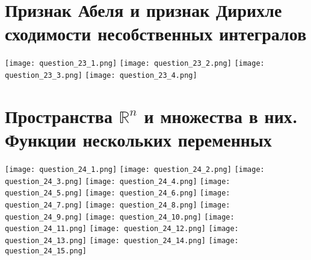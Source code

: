 \documentclass[a4paper,12pt]{article}
\begin{document}
\section{Признак Абеля и признак Дирихле сходимости несобственных интегралов}
\texttt{[image: question\_23\_1.png]}
\texttt{[image: question\_23\_2.png]}
\texttt{[image: question\_23\_3.png]}
\texttt{[image: question\_23\_4.png]}

\section{Пространства \( \mathbb{R}^n \) и множества в них. Функции нескольких переменных}
\texttt{[image: question\_24\_1.png]}
\texttt{[image: question\_24\_2.png]}
\texttt{[image: question\_24\_3.png]}
\texttt{[image: question\_24\_4.png]}
\texttt{[image: question\_24\_5.png]}
\texttt{[image: question\_24\_6.png]}
\texttt{[image: question\_24\_7.png]}
\texttt{[image: question\_24\_8.png]}
\texttt{[image: question\_24\_9.png]}
\texttt{[image: question\_24\_10.png]}
\texttt{[image: question\_24\_11.png]}
\texttt{[image: question\_24\_12.png]}
\texttt{[image: question\_24\_13.png]}
\texttt{[image: question\_24\_14.png]}
\texttt{[image: question\_24\_15.png]}
\end{document}
